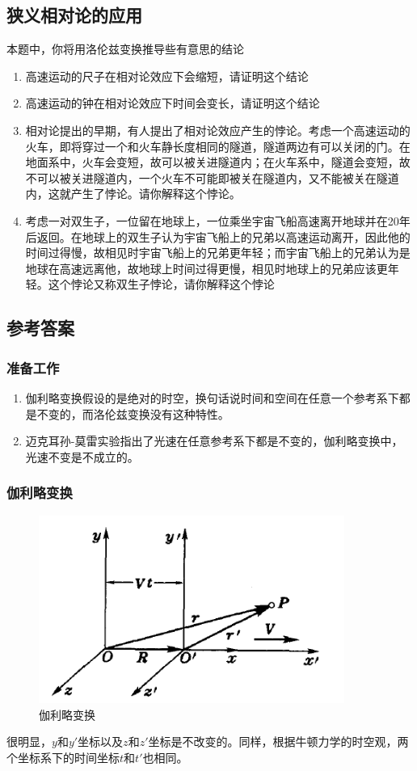 \documentclass[UTF8]{ctexart}
\numberwithin{equation}{section}
\begin{document}
\subsection{狭义相对论的应用}
本题中，你将用洛伦兹变换推导些有意思的结论
\begin{enumerate}
    \item 高速运动的尺子在相对论效应下会缩短，请证明这个结论
    \item 高速运动的钟在相对论效应下时间会变长，请证明这个结论
    \item 相对论提出的早期，有人提出了相对论效应产生的悖论。考虑一个高速运动的火车，即将穿过一个和火车静长度相同的隧道，隧道两边有可以关闭的门。在地面系中，火车会变短，故可以被关进隧道内；在火车系中，隧道会变短，故不可以被关进隧道内，一个火车不可能即被关在隧道内，又不能被关在隧道内，这就产生了悖论。请你解释这个悖论。
    \item 考虑一对双生子，一位留在地球上，一位乘坐宇宙飞船高速离开地球并在20年后返回。在地球上的双生子认为宇宙飞船上的兄弟以高速运动离开，因此他的时间过得慢，故相见时宇宙飞船上的兄弟更年轻；而宇宙飞船上的兄弟认为是地球在高速远离他，故地球上时间过得更慢，相见时地球上的兄弟应该更年轻。这个悖论又称双生子悖论，请你解释这个悖论
\end{enumerate}

\newpage
\subsection{参考答案}
\subsubsection{准备工作}
\begin{enumerate}
    \item 伽利略变换假设的是绝对的时空，换句话说时间和空间在任意一个参考系下都是不变的，而洛伦兹变换没有这种特性。
    \item 迈克耳孙-莫雷实验指出了光速在任意参考系下都是不变的，伽利略变换中，光速不变是不成立的。
\end{enumerate}

\subsubsection{伽利略变换}
\begin{figure}[H]
    \centering
    \includegraphics[width = 10cm]{Galileo.png}
    \caption{伽利略变换}
\end{figure}
很明显，$y$和$y'$坐标以及$z$和$z'$坐标是不改变的。同样，根据牛顿力学的时空观，两个坐标系下的时间坐标$t$和$t'$也相同。
\end{document}
